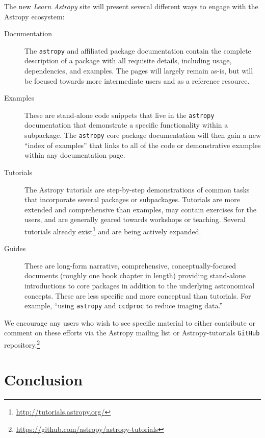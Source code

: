 \documentclass[modern]{aastex61}
\newcommand{\package}[1]{\texttt{#1}\xspace}
\newcommand{\github}{\package{GitHub}}
\newcommand{\astropy}{Astropy\xspace}
\newcommand{\astropypkg}{\package{astropy}}
\begin{document}
The new \emph{Learn Astropy} site will present several different ways to engage
with the \astropy ecosystem:
\begin{description}
    \item[Documentation] The \astropypkg and affiliated package documentation
        contain the complete description of a package with all requisite
        details, including usage, dependencies, and examples.
        The pages will largely remain as-is, but will be focused towards more
        intermediate users and as a reference resource.
    \item[Examples] These are stand-alone code snippets that live in the
        \astropypkg documentation that demonstrate a specific functionality
        within a subpackage.
        The \astropypkg core package documentation will then gain a new ``index
        of examples'' that links to all of the code or demonstrative examples
        within any documentation page.
    \item[Tutorials] The \astropy tutorials are step-by-step demonstrations of
        common tasks that incorporate several packages or subpackages.
        Tutorials are more extended and comprehensive than examples, may contain
        exercises for the users, and are generally geared towards workshops or
        teaching.
        Several tutorials already
        exist\footnote{\url{http://tutorials.astropy.org/}} and are being
        actively expanded.
    \item[Guides] These are long-form narrative, comprehensive,
        conceptually-focused documents (roughly one book chapter in length)
        providing stand-alone introductions to core packages in addition to the
        underlying astronomical concepts.
        These are less specific and more conceptual than tutorials.
        For example, ``using \astropypkg and \package{ccdproc} to reduce imaging
        data.''
\end{description}
We encourage any users who wish to see specific material to either contribute or
comment on these efforts via the \astropy mailing list or \astropy-tutorials
\github repository.\footnote{\url{https://github.com/astropy/astropy-tutorials}}

\section{Conclusion}
\label{sec:conclusion}
\end{document}
